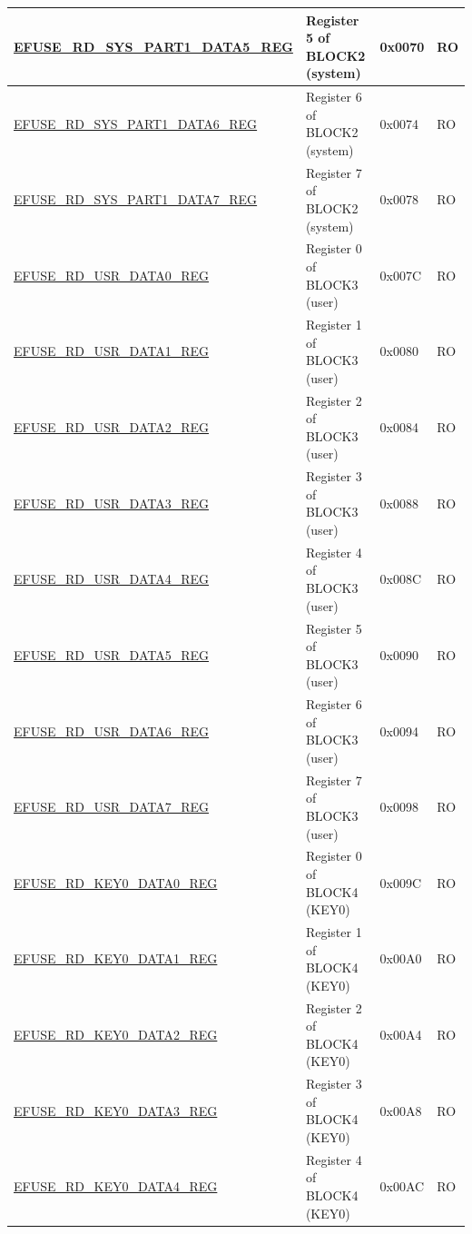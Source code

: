 \begin{longtable}{ | p{6.8cm} | p{7cm} | p{1.3cm} | p{1.2cm} | }
    \hyperref[regdesc:EFUSERDSYSPART1DATA4TO7REG]{EFUSE\_RD\_SYS\_PART1\_DATA5\_REG} & Register 5 of BLOCK2 (system) & 0x0070 & RO \\ \hline
    \hyperref[regdesc:EFUSERDSYSPART1DATA4TO7REG]{EFUSE\_RD\_SYS\_PART1\_DATA6\_REG} & Register 6 of BLOCK2 (system) & 0x0074 & RO \\ \hline
    \hyperref[regdesc:EFUSERDSYSPART1DATA4TO7REG]{EFUSE\_RD\_SYS\_PART1\_DATA7\_REG} & Register 7 of BLOCK2 (system) & 0x0078 & RO \\ \hline
    \hyperref[regdesc:EFUSERDUSRDATANREG]{EFUSE\_RD\_USR\_DATA0\_REG} & Register 0 of BLOCK3 (user) & 0x007C & RO \\ \hline
    \hyperref[regdesc:EFUSERDUSRDATANREG]{EFUSE\_RD\_USR\_DATA1\_REG} & Register 1 of BLOCK3 (user) & 0x0080 & RO \\ \hline
    \hyperref[regdesc:EFUSERDUSRDATANREG]{EFUSE\_RD\_USR\_DATA2\_REG} & Register 2 of BLOCK3 (user) & 0x0084 & RO \\ \hline
    \hyperref[regdesc:EFUSERDUSRDATANREG]{EFUSE\_RD\_USR\_DATA3\_REG} & Register 3 of BLOCK3 (user) & 0x0088 & RO \\ \hline
    \hyperref[regdesc:EFUSERDUSRDATANREG]{EFUSE\_RD\_USR\_DATA4\_REG} & Register 4 of BLOCK3 (user) & 0x008C & RO \\ \hline
    \hyperref[regdesc:EFUSERDUSRDATANREG]{EFUSE\_RD\_USR\_DATA5\_REG} & Register 5 of BLOCK3 (user) & 0x0090 & RO \\ \hline
    \hyperref[regdesc:EFUSERDUSRDATANREG]{EFUSE\_RD\_USR\_DATA6\_REG} & Register 6 of BLOCK3 (user) & 0x0094 & RO \\ \hline
    \hyperref[regdesc:EFUSERDUSRDATANREG]{EFUSE\_RD\_USR\_DATA7\_REG} & Register 7 of BLOCK3 (user) & 0x0098 & RO \\ \hline
    \hyperref[regdesc:EFUSERDKEY0DATANREG]{EFUSE\_RD\_KEY0\_DATA0\_REG} & Register 0 of BLOCK4 (KEY0) & 0x009C & RO \\ \hline
    \hyperref[regdesc:EFUSERDKEY0DATANREG]{EFUSE\_RD\_KEY0\_DATA1\_REG} & Register 1 of BLOCK4 (KEY0) & 0x00A0 & RO \\ \hline
    \hyperref[regdesc:EFUSERDKEY0DATANREG]{EFUSE\_RD\_KEY0\_DATA2\_REG} & Register 2 of BLOCK4 (KEY0) & 0x00A4 & RO \\ \hline
    \hyperref[regdesc:EFUSERDKEY0DATANREG]{EFUSE\_RD\_KEY0\_DATA3\_REG} & Register 3 of BLOCK4 (KEY0) & 0x00A8 & RO \\ \hline
    \hyperref[regdesc:EFUSERDKEY0DATANREG]{EFUSE\_RD\_KEY0\_DATA4\_REG} & Register 4 of BLOCK4 (KEY0) & 0x00AC & RO \\ \hline

\end{longtable}
